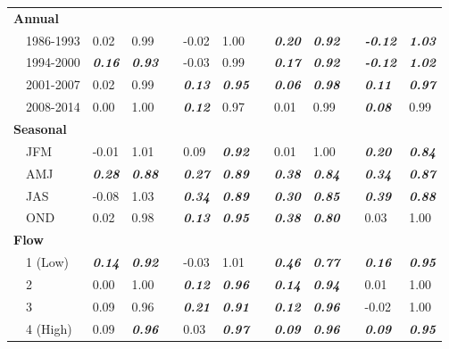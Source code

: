\documentclass[letterpaper,12pt,oneside]{article}\usepackage[]{graphicx}\usepackage[]{color}
\begin{document}
\begin{table}[!tbp]
\begin{center}
\begin{tabular}{lllcllcllcll}
\hline
{\bfseries Annual}&&&&&&&&&&&\tabularnewline
~~1986-1993&0.02&0.99&&-0.02&1.00&&{\bf \textit{0.20}}&{\bf \textit{0.92}}&&{\bf \textit{-0.12}}&{\bf \textit{1.03}}\tabularnewline
~~1994-2000&{\bf \textit{0.16}}&{\bf \textit{0.93}}&&-0.03&0.99&&{\bf \textit{0.17}}&{\bf \textit{0.92}}&&{\bf \textit{-0.12}}&{\bf \textit{1.02}}\tabularnewline
~~2001-2007&0.02&0.99&&{\bf \textit{0.13}}&{\bf \textit{0.95}}&&{\bf \textit{0.06}}&{\bf \textit{0.98}}&&{\bf \textit{0.11}}&{\bf \textit{0.97}}\tabularnewline
~~2008-2014&0.00&1.00&&{\bf \textit{0.12}}&0.97&&0.01&0.99&&{\bf \textit{0.08}}&0.99\tabularnewline
\hline
{\bfseries Seasonal}&&&&&&&&&&&\tabularnewline
~~JFM&-0.01&1.01&&0.09&{\bf \textit{0.92}}&&0.01&1.00&&{\bf \textit{0.20}}&{\bf \textit{0.84}}\tabularnewline
~~AMJ&{\bf \textit{0.28}}&{\bf \textit{0.88}}&&{\bf \textit{0.27}}&{\bf \textit{0.89}}&&{\bf \textit{0.38}}&{\bf \textit{0.84}}&&{\bf \textit{0.34}}&{\bf \textit{0.87}}\tabularnewline
~~JAS&-0.08&1.03&&{\bf \textit{0.34}}&{\bf \textit{0.89}}&&{\bf \textit{0.30}}&{\bf \textit{0.85}}&&{\bf \textit{0.39}}&{\bf \textit{0.88}}\tabularnewline
~~OND&0.02&0.98&&{\bf \textit{0.13}}&{\bf \textit{0.95}}&&{\bf \textit{0.38}}&{\bf \textit{0.80}}&&0.03&1.00\tabularnewline
\hline
{\bfseries Flow}&&&&&&&&&&&\tabularnewline
~~1 (Low)&{\bf \textit{0.14}}&{\bf \textit{0.92}}&&-0.03&1.01&&{\bf \textit{0.46}}&{\bf \textit{0.77}}&&{\bf \textit{0.16}}&{\bf \textit{0.95}}\tabularnewline
~~2&0.00&1.00&&{\bf \textit{0.12}}&{\bf \textit{0.96}}&&{\bf \textit{0.14}}&{\bf \textit{0.94}}&&0.01&1.00\tabularnewline
~~3&0.09&0.96&&{\bf \textit{0.21}}&{\bf \textit{0.91}}&&{\bf \textit{0.12}}&{\bf \textit{0.96}}&&-0.02&1.00\tabularnewline
~~4 (High)&0.09&{\bf \textit{0.96}}&&0.03&{\bf \textit{0.97}}&&{\bf \textit{0.09}}&{\bf \textit{0.96}}&&{\bf \textit{0.09}}&{\bf \textit{0.95}}\tabularnewline
\hline
\end{tabular}\end{center}

\end{table}
\end{document}
